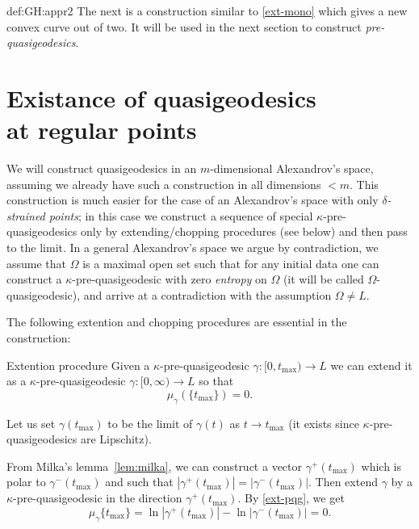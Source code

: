 {\begin{subthm}{def:GH:appr2}
The next is a construction similar to \ref{ext-mono} which gives a new convex
curve out of two. 
It will be used in the next section to construct \emph{pre-quasigeodesics}.






















\section{Existance of quasigeodesics\\ at regular points}\label{step3-1}


We will construct quasigeodesics in an $m$-dimensional Alexandrov's space, assuming
we already have such a construction in all dimensions $<m$. 
This construction is much easier for the case of an Alexandrov's space with only
\textit{$\delta$-strained points}; in this case we construct a sequence of special $\kappa$-pre-quasigeodesics only by
extending/chopping procedures (see below) and then pass to the limit.
In a general Alexandrov's space we argue by contradiction, we assume that $\Omega$ is a maximal
open set such that for any initial data one can construct a $\kappa$-pre-quasigeodesic with zero {\it entropy} on
$\Omega$
(it will be called $\Omega$-quasigeodesic), 
and arrive at a contradiction with the assumption
$\Omega\not=L$.





The following extention and chopping procedures are essential in the construction:

\begin{thm}{Extention procedure}\label{extension} Given a $\kappa$-pre-quasigeodesic
$\gamma:[0,t_{\max})\to L$ we can extend it as a $\kappa$-pre-quasigeodesic
$\gamma:[0,\infty)\to L$ so that 
$$\mu_\gamma(\{t_{\max}\})=0.$$
\end{thm}
Let us set $\gamma(t_{\max})$ to be the limit of $\gamma(t)$ as $t\to t_{\max}$
(it exists since $\kappa$-pre-quasigeodesics are Lipschitz).

From Milka's lemma~\ref{lem:milka}, we can construct a vector 
$\gamma^+(t_{\max})$ which is polar to $\gamma^-(t_{\max})$
and such that
$|\gamma^+(t_{\max})|=|\gamma^-(t_{\max})|$.
Then extend $\gamma$ by a $\kappa$-pre-quasigeodesic in the direction $\gamma^+(t_{\max})$. 
By \ref{ext-pqg}, we get
$$\mu_\gamma\{t_{\max}\}=\ln|\gamma^+(t_{\max})|-\ln|\gamma^-(t_{\max}
)|=0.$$\qeds


\end{subthm}}
